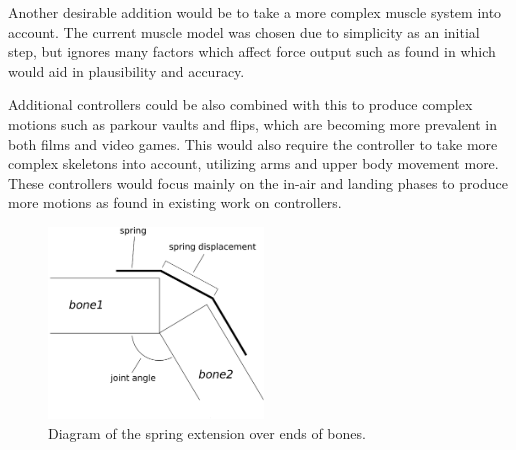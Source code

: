 \documentclass[landscape,26pt]{sciposter}
\begin{document}
\begin{minipage}[t]{14in}
        Another desirable addition would be to take a more complex muscle system into account.  The current muscle model was chosen due to simplicity as an initial step, but ignores many factors which affect force output such as found in \cite{muscle_based_bipeds} which would aid in plausibility and accuracy.

        Additional controllers could be also combined with this to produce complex motions such as parkour vaults and flips, which are becoming more prevalent in both films and video games.  This would also require the controller to take more complex skeletons into account, utilizing arms and upper body movement more.  These controllers would focus mainly on the in-air and landing phases to produce more motions as found in existing work on controllers. \cite{falling_landing, composable_controllers, anim_human_athletics}

		
	\vspace{0.2in}

	{\footnotesize
	
    \nocite{muscle_based_bipeds}
    \nocite{anim_human_athletics}
    \nocite{composable_controllers}
    \nocite{falling_landing}

    \begin{figure}
        \label{fig:bone_diag}
        \centering
        \includegraphics[height=2in]{diagrams/spring_angle_calc.eps}
        \caption{Diagram of the spring extension over ends of bones.}
    \end{figure}

	
	}
\end{minipage}
\end{document}
